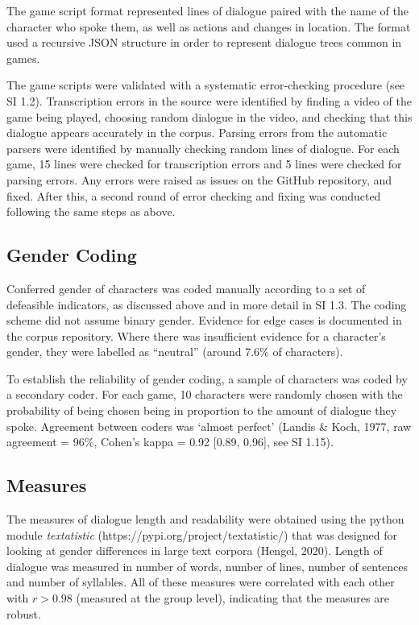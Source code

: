 \documentclass[12pt,a4paper]{article}
\begin{document}
The game script format represented lines of dialogue paired with the name of the character who spoke them, as well as actions and changes in location. The format used a recursive JSON structure in order to represent dialogue trees common in games. 

The game scripts were validated with a systematic error-checking procedure (see SI 1.2). Transcription errors in the source were identified by finding a video of the game being played, choosing random dialogue in the video, and checking that this dialogue appears accurately in the corpus. Parsing errors from the automatic parsers were identified by manually checking random lines of dialogue. For each game, 15 lines were checked for transcription errors and 5 lines were checked for parsing errors. Any errors were raised as issues on the GitHub repository, and fixed. After this, a second round of error checking and fixing was conducted following the same steps as above.

\subsection*{Gender Coding}

Conferred gender of characters was coded manually according to a set of defeasible indicators, as discussed above and in more detail in SI 1.3. The coding scheme did not assume binary gender. Evidence for edge cases is documented in the corpus repository. Where there was insufficient evidence for a character's gender, they were labelled as ``neutral'' (around 7.6\% of characters).  

To establish the reliability of gender coding, a sample of characters was coded by a secondary coder. For each game, 10 characters were randomly chosen with the probability of being chosen being in proportion to the amount of dialogue they spoke. Agreement between coders was `almost perfect' (Landis \& Koch, 1977, raw agreement = 96\%, Cohen's kappa = 0.92 [0.89, 0.96], see SI 1.15).


\subsection*{Measures}
The measures of dialogue length and readability were obtained using the python module \emph{textatistic} (https://pypi.org/project/textatistic/) that was designed for looking at gender differences in large text corpora (Hengel, 2020). Length of dialogue was measured in number of words, number of lines, number of sentences and number of syllables. All of these measures were correlated with each other with $r > 0.98$ (measured at the group level), indicating that the measures are robust.
\end{document}

